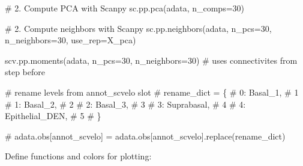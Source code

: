 \documentclass[
  letterpaper,
  DIV=11,
  numbers=noendperiod]{scrreprt}
\newenvironment{Shaded}{\begin{snugshade}}{\end{snugshade}}
\newcommand{\CommentTok}[1]{\textcolor[rgb]{0.37,0.37,0.37}{#1}}
\newcommand{\DecValTok}[1]{\textcolor[rgb]{0.68,0.00,0.00}{#1}}
\newcommand{\NormalTok}[1]{\textcolor[rgb]{0.00,0.23,0.31}{#1}}
\newcommand{\OperatorTok}[1]{\textcolor[rgb]{0.37,0.37,0.37}{#1}}
\newcommand{\StringTok}[1]{\textcolor[rgb]{0.13,0.47,0.30}{#1}}
\begin{document}
\begin{Shaded}
\begin{Highlighting}[]
\CommentTok{\# 2. Compute PCA with Scanpy}
\NormalTok{sc.pp.pca(adata, n\_comps}\OperatorTok{=}\DecValTok{30}\NormalTok{)}

\CommentTok{\# 2. Compute neighbors with Scanpy}
\NormalTok{sc.pp.neighbors(adata, n\_pcs}\OperatorTok{=}\DecValTok{30}\NormalTok{, n\_neighbors}\OperatorTok{=}\DecValTok{30}\NormalTok{, use\_rep}\OperatorTok{=}\StringTok{\textquotesingle{}X\_pca\textquotesingle{}}\NormalTok{)}

\NormalTok{scv.pp.moments(adata, n\_pcs}\OperatorTok{=}\DecValTok{30}\NormalTok{, n\_neighbors}\OperatorTok{=}\DecValTok{30}\NormalTok{) }\CommentTok{\# uses connectivites from step before}

\CommentTok{\# rename levels from annot\_scvelo slot}
\CommentTok{\# rename\_dict = \{}
\CommentTok{\#     0: \textquotesingle{}Basal\_1\textquotesingle{}, \# 1}
\CommentTok{\#     1: \textquotesingle{}Basal\_2\textquotesingle{}, \# 2}
\CommentTok{\#     2: \textquotesingle{}Basal\_3\textquotesingle{}, \# 3}
\CommentTok{\#     3: \textquotesingle{}Suprabasal\textquotesingle{}, \# 4}
\CommentTok{\#     4: \textquotesingle{}Epithelial\_DEN\textquotesingle{}, \# 5}
\CommentTok{\# \}}

\CommentTok{\# adata.obs[\textquotesingle{}annot\_scvelo\textquotesingle{}] = adata.obs[\textquotesingle{}annot\_scvelo\textquotesingle{}].replace(rename\_dict)}
\end{Highlighting}
\end{Shaded}

Define functions and colors for plotting:
\end{document}
